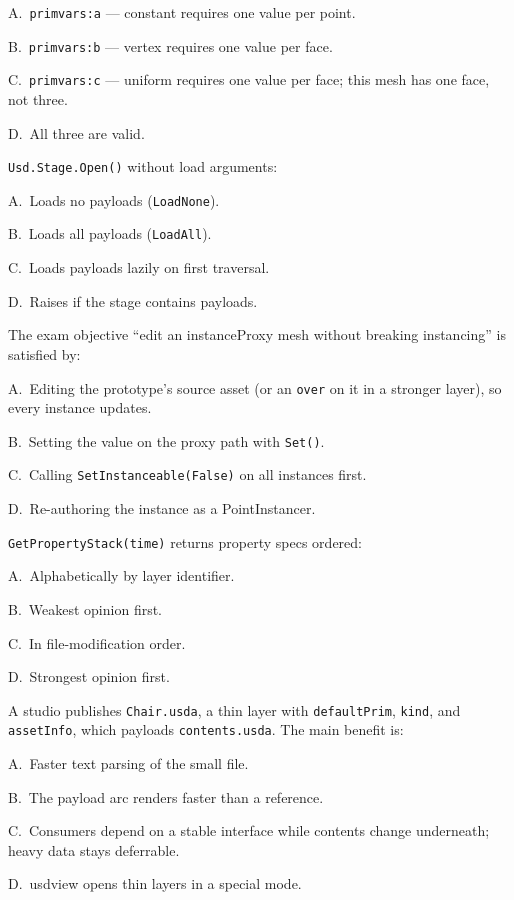 \begin{Choices}
  \item A.\ \texttt{primvars:a} --- constant requires one value per point.
  \item B.\ \texttt{primvars:b} --- vertex requires one value per face.
  \item C.\ \texttt{primvars:c} --- uniform requires one value per face; this mesh has one face, not three.
  \item D.\ All three are valid.
\end{Choices}

\texttt{Usd.Stage.Open()} without load arguments:
\begin{Choices}
  \item A.\ Loads no payloads (\texttt{LoadNone}).
  \item B.\ Loads all payloads (\texttt{LoadAll}).
  \item C.\ Loads payloads lazily on first traversal.
  \item D.\ Raises if the stage contains payloads.
\end{Choices}

The exam objective ``edit an instanceProxy mesh without breaking
instancing'' is satisfied by:
\begin{Choices}
  \item A.\ Editing the prototype's source asset (or an \texttt{over} on it in a stronger layer), so every instance updates.
  \item B.\ Setting the value on the proxy path with \texttt{Set()}.
  \item C.\ Calling \texttt{SetInstanceable(False)} on all instances first.
  \item D.\ Re-authoring the instance as a PointInstancer.
\end{Choices}

\texttt{GetPropertyStack(time)} returns property specs ordered:
\begin{Choices}
  \item A.\ Alphabetically by layer identifier.
  \item B.\ Weakest opinion first.
  \item C.\ In file-modification order.
  \item D.\ Strongest opinion first.
\end{Choices}

A studio publishes \texttt{Chair.usda}, a thin layer with
\texttt{defaultPrim}, \texttt{kind}, and \texttt{assetInfo}, which payloads
\texttt{contents.usda}. The main benefit is:
\begin{Choices}
  \item A.\ Faster text parsing of the small file.
  \item B.\ The payload arc renders faster than a reference.
  \item C.\ Consumers depend on a stable interface while contents change underneath; heavy data stays deferrable.
  \item D.\ usdview opens thin layers in a special mode.
\end{Choices}

